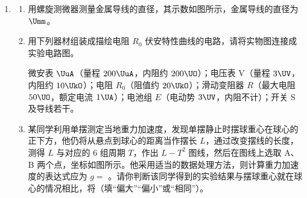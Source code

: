 \documentclass[\gkver]{gaokaozhenti}
\begin{document}
\begin{enumerate}
\item
\begin{enumerate}
	\item
	用螺旋测微器测量金属导线的直径，其示数如图所示，金属导线的直径为$\Umm$。


	\item
	用下列器材组装成描绘电阻 $R_{0}$ 伏安特性曲线的电路，请将实物图连接成实验电路图。

	微安表 $\UuA$（量程 $200\UuA$，内阻约 $200\UO$）；电压表 V（量程 $3\UV$，内阻约 $10\UkO$）；电阻 $R_{0}$（阻值约 $20\UkO$）；滑动变阻器 $R$（最大电阻 $50\UO$，额定电流 $1\UA$）；电池组 $E$（电动势 $3\UV$，内阻不计）；开关 S 及导线若干。


	\item
	某同学利用单摆测定当地重力加速度，发现单摆静止时摆球重心在球心的正下方，他仍将从悬点到球心的距离当作摆长 $L$，通过改变摆线的长度，测得 $L$ 与对应的 6 组周期 $T$，作出 $L-T^{2}$ 图线，然后在图线上选取 A、B 两个点，坐标如图所示。他采用适当的数据处理方法，则计算重力加速度的表达式应为 $g=$ 。请你判断该同学得到的实验结果与摆球重心就在球心的情况相比，将（填“偏大”“偏小”或“相同”）。

\end{enumerate}


\end{enumerate}
\end{document}
